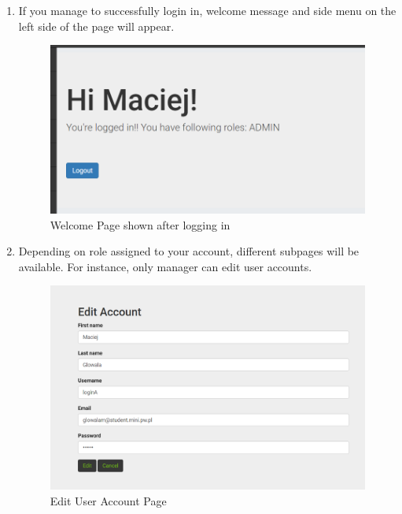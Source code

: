 \documentclass[a4paper,11pt,twoside]{report}
\theoremstyle{definition}
\begin{document}
\begin{enumerate}
\begin{enumerate}
\item If you manage to successfully login in, welcome message and side menu on the left side of the page 
will appear.
\begin{figure}[h!]
\begin{center}
\includegraphics[width=\textwidth]{AS/login/2}
\end{center}
\caption{Welcome Page shown after logging in}
\end{figure}

\item Depending on role assigned to your account, different subpages will be available. For instance, only manager can edit user accounts.

\begin{figure}[h!]
\begin{center}
\includegraphics[width=\textwidth]{AS/login/5}
\end{center}
\caption{Edit User Account Page}
\end{figure}


\end{enumerate}
\end{enumerate}
\end{document}

